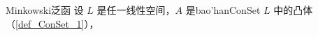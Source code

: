 

\begin{definition}{Minkowski泛函}
设 $L$ 是任一线性空间，$A$ 是bao'han{ConSet} $L$ 中的凸体（\autoref{def_ConSet_1}），
\end{definition}
